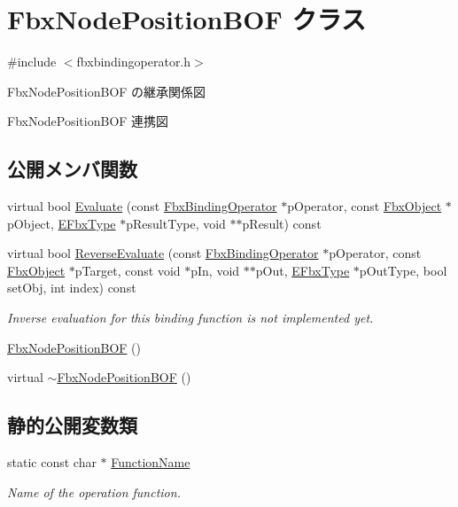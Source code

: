 \hypertarget{class_fbx_node_position_b_o_f}{}\section{Fbx\+Node\+Position\+B\+OF クラス}
\label{class_fbx_node_position_b_o_f}


{\ttfamily \#include $<$fbxbindingoperator.\+h$>$}



Fbx\+Node\+Position\+B\+OF の継承関係図


Fbx\+Node\+Position\+B\+OF 連携図
\subsection*{公開メンバ関数}
\begin{DoxyCompactItemize}
\item 
virtual bool \hyperlink{class_fbx_node_position_b_o_f_ac2f916b57120cd4ba7d6df7a55a180c2}{Evaluate} (const \hyperlink{class_fbx_binding_operator}{Fbx\+Binding\+Operator} $\ast$p\+Operator, const \hyperlink{class_fbx_object}{Fbx\+Object} $\ast$p\+Object, \hyperlink{fbxpropertytypes_8h_a73913a5ddfb20e57c6f25e9e6784bd92}{E\+Fbx\+Type} $\ast$p\+Result\+Type, void $\ast$$\ast$p\+Result) const
\item 
virtual bool \hyperlink{class_fbx_node_position_b_o_f_a1f42ed86523fe35e64c63ee1c85dc22a}{Reverse\+Evaluate} (const \hyperlink{class_fbx_binding_operator}{Fbx\+Binding\+Operator} $\ast$p\+Operator, const \hyperlink{class_fbx_object}{Fbx\+Object} $\ast$p\+Target, const void $\ast$p\+In, void $\ast$$\ast$p\+Out, \hyperlink{fbxpropertytypes_8h_a73913a5ddfb20e57c6f25e9e6784bd92}{E\+Fbx\+Type} $\ast$p\+Out\+Type, bool set\+Obj, int index) const
\begin{DoxyCompactList}\small\item\em Inverse evaluation for this binding function is not implemented yet. \end{DoxyCompactList}\item 
\hyperlink{class_fbx_node_position_b_o_f_a3aa291cede0af3b651fe2dbc57914ff6}{Fbx\+Node\+Position\+B\+OF} ()
\item 
virtual \hyperlink{class_fbx_node_position_b_o_f_af99d0ed70d8a877472932fa6ccb39199}{$\sim$\+Fbx\+Node\+Position\+B\+OF} ()
\end{DoxyCompactItemize}
\subsection*{静的公開変数類}
\begin{DoxyCompactItemize}
\item 
static const char $\ast$ \hyperlink{class_fbx_node_position_b_o_f_aaa0c4610384d1dbb4e566bad44c356ee}{Function\+Name}
\begin{DoxyCompactList}\small\item\em Name of the operation function. \end{DoxyCompactList}\end{DoxyCompactItemize}


